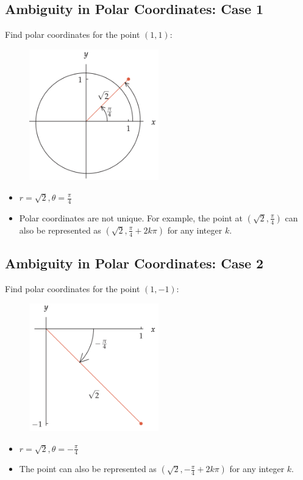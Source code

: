 \subsection{Ambiguity in Polar Coordinates: Case 1}
Find polar coordinates for the point \((1, 1)\):
\begin{figure}
    \centering
    \includegraphics[width=0.5\textwidth]{pics/polar3.png}
\end{figure}
\begin{itemize}
    \item \(r = \sqrt{2}, \theta = \frac{\pi}{4}\)
    \item Polar coordinates are not unique. For example, the point at \( (\sqrt{2}, \frac{\pi}{4}) \) can also be represented as \( (\sqrt{2}, \frac{\pi}{4} + 2k\pi) \)  for any integer \( k \).
\end{itemize}

\subsection{Ambiguity in Polar Coordinates: Case 2}
Find polar coordinates for the point \((1, -1)\):
\begin{figure}
    \centering
    \includegraphics[width=0.5\textwidth]{pics/polar4.png}
\end{figure}
\begin{itemize}
    \item \(r = \sqrt{2}, \theta = -\frac{\pi}{4}\)
    \item The point can also be represented as \( (\sqrt{2}, -\frac{\pi}{4} + 2k\pi) \) for any integer \( k \).
\end{itemize}

